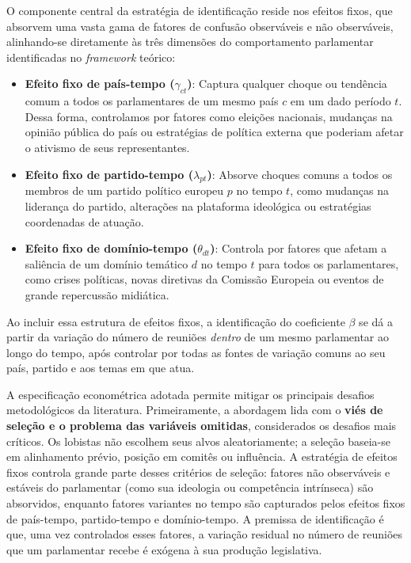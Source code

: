O componente central da estratégia de identificação reside nos efeitos fixos, que absorvem uma vasta gama de fatores de confusão observáveis e não observáveis, alinhando-se diretamente às três dimensões do comportamento parlamentar identificadas no \textit{framework} teórico:
\begin{itemize}
    \item \textbf{Efeito fixo de país-tempo ($\gamma_{ct}$)}: Captura qualquer choque ou tendência comum a todos os parlamentares de um mesmo país $c$ em um dado período $t$. Dessa forma, controlamos por fatores como eleições nacionais, mudanças na opinião pública do país ou estratégias de política externa que poderiam afetar o ativismo de seus representantes.
    \item \textbf{Efeito fixo de partido-tempo ($\lambda_{pt}$)}: Absorve choques comuns a todos os membros de um partido político europeu $p$ no tempo $t$, como mudanças na liderança do partido, alterações na plataforma ideológica ou estratégias coordenadas de atuação.
    \item \textbf{Efeito fixo de domínio-tempo ($\theta_{dt}$)}: Controla por fatores que afetam a saliência de um domínio temático $d$ no tempo $t$ para todos os parlamentares, como crises políticas, novas diretivas da Comissão Europeia ou eventos de grande repercussão midiática.
\end{itemize}

Ao incluir essa estrutura de efeitos fixos, a identificação do coeficiente $\beta$ se dá a partir da variação do número de reuniões \textit{dentro} de um mesmo parlamentar ao longo do tempo, após controlar por todas as fontes de variação comuns ao seu país, partido e aos temas em que atua.

A especificação econométrica adotada permite mitigar os principais desafios metodológicos da literatura. Primeiramente, a abordagem lida com o \textbf{viés de seleção e o problema das variáveis omitidas}, considerados os desafios mais críticos. Os lobistas não escolhem seus alvos aleatoriamente; a seleção baseia-se em alinhamento prévio, posição em comitês ou influência. A estratégia de efeitos fixos controla grande parte desses critérios de seleção: fatores não observáveis e estáveis do parlamentar (como sua ideologia ou competência intrínseca) são absorvidos, enquanto fatores variantes no tempo são capturados pelos efeitos fixos de país-tempo, partido-tempo e domínio-tempo. A premissa de identificação é que, uma vez controlados esses fatores, a variação residual no número de reuniões que um parlamentar recebe é exógena à sua produção legislativa.

